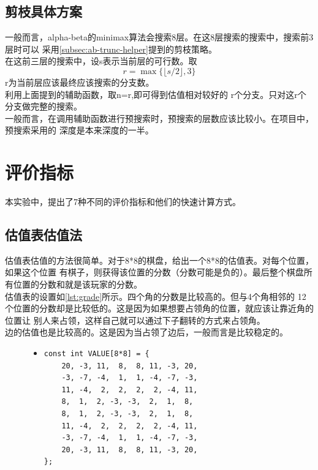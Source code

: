 \documentclass[a4paper]{article}
\begin{document}
\subsection{剪枝具体方案}
一般而言，alpha-beta的minimax算法会搜索8层。在这8层搜索的搜索中，搜索前3层时可以
采用\autoref{subsec:ab-trunc-helper}提到的剪枝策略。\\

在这前三层的搜索中，设s表示当前层的可行数。取$$r = \max \{\lfloor s / 2 \rfloor, 3\}$$
r为当前层应该最终应该搜索的分支数。\\

利用上面提到的辅助函数，取n=r,即可得到估值相对较好的
r个分支。只对这r个分支做完整的搜索。\\

一般而言，在调用辅助函数进行预搜索时，预搜索的层数应该比较小。在项目中，预搜索采用的
深度是本来深度的一半。

\section{评价指标}
本实验中，提出了7种不同的评价指标和他们的快速计算方式。
\subsection{估值表估值法}
估值表估值的方法很简单。对于8*8的棋盘，给出一个8*8的估值表。对每个位置，如果这个位置
有棋子，则获得该位置的分数（分数可能是负的）。最后整个棋盘所有位置的分数和就是该玩家的分数。\\

估值表的设置如\autoref{lst:grade}所示。四个角的分数是比较高的。但与4个角相邻的
12个位置的分数却是比较低的。这是因为如果想要占领角的位置，就应该让靠近角的位置让
别人来占领，这样自己就可以通过下子翻转的方式来占领角。\\

边的估值也是比较高的。这是因为当占领了边后，一般而言是比较稳定的。\\

\begin{figure}[!hbt]
\begin{itemize}
\item[] \begin{lstlisting}[style=mycpp, label=lst:grade, caption=估值表的设置]
const int VALUE[8*8] = {
    20, -3, 11,  8,  8, 11, -3, 20,
    -3, -7, -4,  1,  1, -4, -7, -3,
    11, -4,  2,  2,  2,  2, -4, 11,
    8,  1,  2, -3, -3,  2,  1,  8,
    8,  1,  2, -3, -3,  2,  1,  8,
    11, -4,  2,  2,  2,  2, -4, 11,
    -3, -7, -4,  1,  1, -4, -7, -3,
    20, -3, 11,  8,  8, 11, -3, 20,
};
\end{lstlisting}
\end{itemize}
\end{figure}
\end{document}

